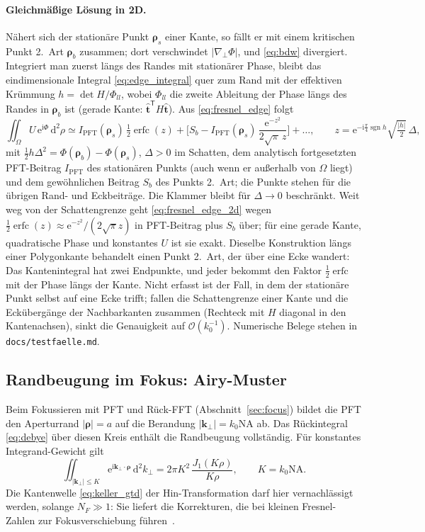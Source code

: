 \documentclass[11pt,a4paper]{scrartcl}
\theoremstyle{insightstyle}
\newcommand{\dd}{\mathrm{d}}
\newcommand{\ii}{\mathrm{i}}
\newcommand{\ee}{\mathrm{e}}
\newcommand{\grad}{\nabla_{\!\perp}}
\newcommand{\rh}{\bm{\rho}}
\newcommand{\kp}{\bm{k}_\perp}
\newcommand{\NA}{\mathrm{NA}}
\DeclareMathOperator{\sgn}{sgn}
\DeclareMathOperator{\erfc}{erfc}
\begin{document}
\paragraph{Gleichmäßige Lösung in 2D.} Nähert sich der stationäre Punkt $\rh_s$ einer Kante, so fällt er mit einem kritischen Punkt 2.~Art $\rh_b$ zusammen; dort verschwindet $|\grad\Phi|$, und \eqref{eq:bdw} divergiert. Integriert man zuerst längs des Randes mit stationärer Phase, bleibt das eindimensionale Integral \eqref{eq:edge_integral} quer zum Rand mit der effektiven Krümmung $h=\det H/\Phi_{ll}$, wobei $\Phi_{ll}$ die zweite Ableitung der Phase längs des Randes in $\rh_b$ ist (gerade Kante: $\hat{\bm t}^{\mathsf T}H\hat{\bm t}$). Aus \eqref{eq:fresnel_edge} folgt
\begin{equation}
    \iint_\Omega U\,\ee^{\ii\Phi}\,\dd^2\rho \simeq I_\text{PFT}(\rh_s)\,\tfrac12\erfc(z) + \Big[S_b - I_\text{PFT}(\rh_s)\,\frac{\ee^{-z^2}}{2\sqrt\pi\,z}\Big] + \dots,\qquad z=\ee^{-\ii\frac\pi4\sgn h}\sqrt{\tfrac{|h|}{2}}\,\Delta,
    \label{eq:fresnel_edge_2d}
\end{equation}
mit $\tfrac12 h\Delta^2=\Phi(\rh_b)-\Phi(\rh_s)$, $\Delta>0$ im Schatten, dem analytisch fortgesetzten PFT-Beitrag $I_\text{PFT}$ des stationären Punkts (auch wenn er außerhalb von $\Omega$ liegt) und dem gewöhnlichen Beitrag $S_b$ des Punkts 2.~Art; die Punkte stehen für die übrigen Rand- und Eckbeiträge. Die Klammer bleibt für $\Delta\to0$ beschränkt. Weit weg von der Schattengrenze geht \eqref{eq:fresnel_edge_2d} wegen $\tfrac12\erfc(z)\approx\ee^{-z^2}/(2\sqrt\pi z)$ in PFT-Beitrag plus $S_b$ über; für eine gerade Kante, quadratische Phase und konstantes $U$ ist sie exakt. Dieselbe Konstruktion längs einer Polygonkante behandelt einen Punkt 2.~Art, der über eine Ecke wandert: Das Kantenintegral hat zwei Endpunkte, und jeder bekommt den Faktor $\tfrac12\erfc$ mit der Phase längs der Kante. Nicht erfasst ist der Fall, in dem der stationäre Punkt selbst auf eine Ecke trifft; fallen die Schattengrenze einer Kante und die Eckübergänge der Nachbarkanten zusammen (Rechteck mit $H$ diagonal in den Kantenachsen), sinkt die Genauigkeit auf $\mathcal O(k_0^{-1})$. Numerische Belege stehen in \texttt{docs/testfaelle.md}.

\subsection{Randbeugung im Fokus: Airy-Muster}
Beim Fokussieren mit PFT und Rück-FFT (Abschnitt~\ref{sec:focus}) bildet die PFT den Aperturrand $|\rh|=a$ auf die Berandung $|\kp|=k_0\NA$ ab. Das Rückintegral \eqref{eq:debye} über diesen Kreis enthält die Randbeugung vollständig. Für konstantes Integrand-Gewicht gilt
\begin{equation}
    \iint_{|\kp|\le K}\ee^{\ii\kp\cdot\rh}\,\dd^2k_\perp = 2\pi K^2\,\frac{J_1(K\rho)}{K\rho},\qquad K=k_0\NA .
\end{equation}
Die Kantenwelle \eqref{eq:keller_gtd} der Hin-Transformation darf hier vernachlässigt werden, solange $N_F\gg1$: Sie liefert die Korrekturen, die bei kleinen Fresnel-Zahlen zur Fokusverschiebung führen~\cite{wolfli1981}.
\end{document}
